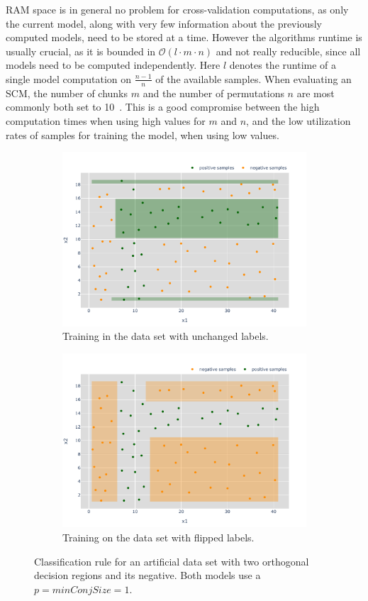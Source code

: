 RAM space is in general no problem for cross-validation computations, as only
the current model, along with very few information about the previously computed models, need to be stored at a time.
However the algorithms runtime is usually crucial, as it is bounded in \(\mathcal{O}(l \cdot m \cdot n)\)
and not really reducible, since all models need to be computed independently.
Here \(l\) denotes the runtime of a single model computation on \(\frac{n-1}{n}\) of the available samples.
When evaluating an SCM, the number of chunks \(m\) and the number of permutations \(n\) are most commonly both set to 10~\citep{kestler11,lausser20}.
This is a good compromise between the high computation times when using high values for \(m\) and \(n\),
and the low utilization rates of samples for training the model, when using low values.

\begin{figure}
    \centering
    \begin{subfigure}{\textwidth}
        \centering
        \includegraphics[width=0.85\columnwidth]{figures/cross_1.pdf}
        \caption{Training in the data set with unchanged labels.}
    \end{subfigure}
    \begin{subfigure}{\textwidth}
        \centering
        \includegraphics[width=0.85\columnwidth]{figures/cross_1_negated.pdf}
        \caption{Training on the data set with flipped labels.}
    \end{subfigure}
    \caption{Classification rule for an artificial data set with two orthogonal decision regions and its negative.
        Both models use a \(p = minConjSize = 1\).}\label{fig:crossNegative}
\end{figure}


